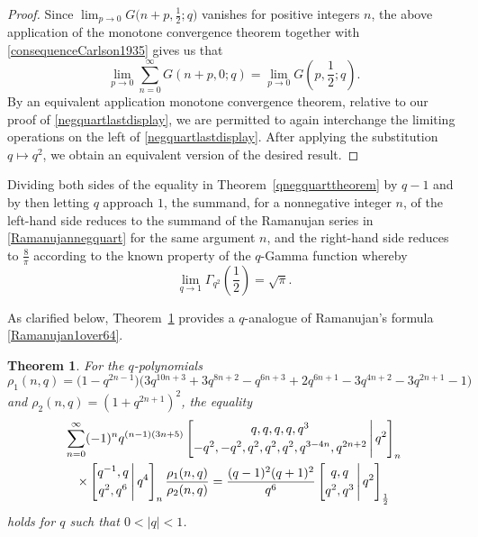 \documentclass[12pt]{article}
\newtheorem{theorem}{Theorem}
\begin{document}
\begin{proof}
 Since $\lim_{p \to 0} G\big(n+p, \frac{1}{2}; q \big)$ vanishes for positive integers $n$, 
 the above application of the monotone convergence theorem together with 
 \eqref{consequenceCarlson1935} gives us that 
\begin{equation}\label{negquartlastdisplay}
 \lim_{p \to 0} \sum_{n=0}^{\infty} G(n + p, 0; q) = \lim_{p \to 0} G\left( p, \frac{1}{2}; q \right). 
\end{equation}
 By an equivalent application monotone convergence theorem, relative to our proof of \eqref{negquartlastdisplay}, 
 we are permitted to again interchange the limiting operations on the left of \eqref{negquartlastdisplay}. 
 After applying the substitution $q \mapsto q^2$, we obtain 
 an equivalent version of the desired result. 
\end{proof}

 Dividing both sides of the equality in Theorem~\ref{qnegquarttheorem} by $q - 1$ and by then letting $q$ approach $1$, the 
 summand, for a nonnegative integer $n$, of the left-hand side reduces to the summand of the Ramanujan series in 
 \eqref{Ramanujannegquart} for the same argument $n$, and the right-hand side reduces to $\frac{8}{\pi}$ according to the known 
 property of the $q$-Gamma function whereby 
\begin{equation}\label{closedqGamma}
 \lim_{q \to 1} \Gamma_{q^2}\left( \frac{1}{2} \right) = \sqrt{\pi}.
\end{equation}

 As clarified below, Theorem~\ref{q64theorem} provides a $q$-analogue of Ramanujan's formula \eqref{Ramanujan1over64}. 

\begin{theorem}\label{q64theorem}
 For the $q$-polynomials 
 $$ \rho_1(n, q) = 
 \big(1-q^{2 n-1}\big) \big(3 q^{10 n+3} +3 q^{8 n+2} -q^{6 n+3} +2 q^{6 n+1} -3 q^{4 n+2} -3 q^{2 n+1} -1\big) $$
 and $\rho_{2}(n, q) = \left(1 + q^{2 n+1}\right)^2$, the equality 
\begin{multline*}
 \sum_{n=0}^{\infty} (-1)^n q^{ (n-1) (3 n+5) } 
 \left[ \begin{matrix} 
 q, q, q, q, q^3 
 \vspace{1mm} \\ 
 -q^2, -q^2, q^2, q^2, q^2, q^{3-4n}, q^{2n+2} \end{matrix} \, \Bigg| \, q^2 \right]_{n} \\ 
 \times \left[ \begin{matrix} 
 q^{-1}, q 
 \vspace{1mm} \\ 
 q^2, q^6 \end{matrix} \, \Bigg| \, q^4 \right]_{n} \frac{\rho_1(n, q)}{\rho_2(n, q)} 
 = \frac{(q-1)^2 (q+1)^2}{q^6} 
 \left[ \begin{matrix} q, q \vspace{1mm} \\ 
 q^2, q^3 \end{matrix} \, \Bigg| \, q^2 \right]_{\frac{1}{2}} 
\end{multline*}
 holds for $q$ such that $0 < |q| < 1$. 
\end{theorem}
\end{document}

